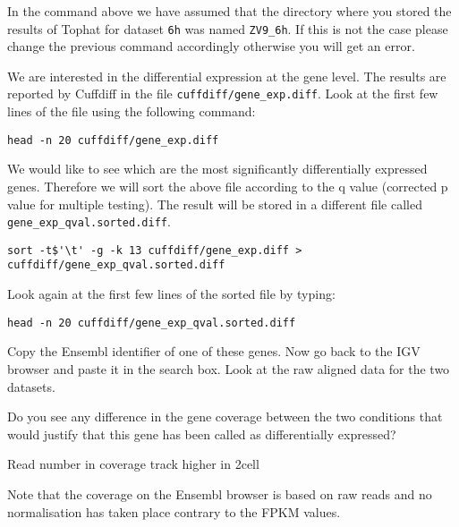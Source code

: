 \begin{warning}
In the command above we have assumed that the directory where you stored the
results of Tophat for dataset \texttt{6h} was named \texttt{ZV9\_6h}. If this
is not the case please change the previous command accordingly otherwise you
will get an error.
\end{warning}

\begin{steps}
We are interested in the differential expression at the gene level. The results
are reported by Cuffdiff in the file \texttt{cuffdiff/gene\_exp.diff}. 
Look at the first few lines of the file using the following command:
\begin{lstlisting}
head -n 20 cuffdiff/gene_exp.diff
\end{lstlisting}

We would like to see which are the most significantly differentially expressed
genes. Therefore we will sort the above file according to the q value
(corrected p value for multiple testing). The result will be stored in a
different file called \texttt{gene\_exp\_qval.sorted.diff}.
\begin{lstlisting}
sort -t$'\t' -g -k 13 cuffdiff/gene_exp.diff > cuffdiff/gene_exp_qval.sorted.diff
\end{lstlisting}

Look again at the first few lines of the sorted file by typing:
\begin{lstlisting}
head -n 20 cuffdiff/gene_exp_qval.sorted.diff
\end{lstlisting}

Copy the Ensembl identifier of one of these genes. Now go back to the IGV
browser and paste it in the search box. Look at the raw aligned data for the
two datasets.
\end{steps}

\begin{questions}
Do you see any difference in the gene coverage between the two conditions that
would justify that this gene has been called as differentially expressed?
\begin{answer}
Read number in coverage track higher in 2cell
\end{answer}

\end{questions}

\begin{warning}
Note that the coverage on the Ensembl browser is based on raw reads and no
normalisation has taken place contrary to the FPKM values.
\end{warning}

